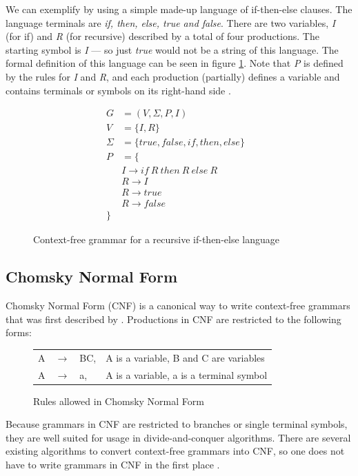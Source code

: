 \documentclass[a4paper,12pt,notitlepage]{report}
\renewcommand\cite{\citep}
\begin{document}
We can exemplify by using a simple made-up language of if-then-else clauses.
The language terminals are \textit{if, then, else, true and false}.  There are
two variables, \textit{I} (for if) and \textit{R} (for recursive) described by a
total of four productions. The starting symbol is \textit{I} --- so just
\textit{true} would not be a string of this language. The formal definition of
this language can be seen in figure \ref{iflang}. Note that \textit{P} is
defined by the rules for \textit{I} and \textit{R}, and each production
(partially) defines a variable and contains terminals or symbols on its
right-hand side \cite[p.171]{automatabook}.

\begin{figure}[H]
\begin{align*}
G &= (V, \Sigma , P, I) \\
V &= \{I,R\} \\
\Sigma &= \{true,false,if,then,else\} \\
P &= \{& \\
& I \rightarrow if\ R\ then\ R\ else\ R \\
& R \rightarrow I \\
& R \rightarrow true \\
& R \rightarrow false \\
\}
\end{align*}
\caption{\small Context-free grammar for a recursive if-then-else language}
\label{iflang}
\end{figure}

\subsection{Chomsky Normal Form}
Chomsky Normal Form (CNF) is a canonical way to write context-free grammars that
was first described by \citet{chomskycnf}. Productions in CNF are restricted to
the following forms:

\begin{figure}[H]
\begin{tabular}{l l l l}
    A & $\rightarrow$ & BC, & A is a variable, B and C are variables \\
    A & $\rightarrow$ & a, & A is a variable, a is a terminal symbol \\
\end{tabular}
\caption{\small Rules allowed in Chomsky Normal Form}
\end{figure}
Because grammars in CNF are restricted to branches or single terminal symbols,
they are well suited for usage in divide-and-conquer algorithms. There are
several existing algorithms to convert context-free grammars into CNF, so one
does not have to write grammars in CNF in the first place \cite{langeleiss}.
\end{document}
